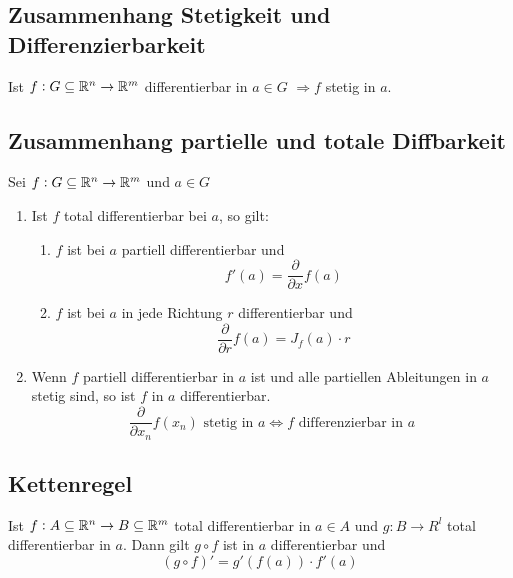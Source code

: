 \subsection{Zusammenhang Stetigkeit und Differenzierbarkeit}
Ist $f: G \subseteq \mathbb{R}^n \rightarrow \mathbb{R}^m$ differentierbar in $a \in G$
$\Rightarrow f$ stetig in $a$.

\subsection{Zusammenhang partielle und totale Diffbarkeit}
Sei $f: G \subseteq \mathbb{R}^n \rightarrow \mathbb{R}^m$ und $a \in G$
\begin{enumerate}[label= (\alph*)]
    \item Ist $f$ total differentierbar bei $a$, so gilt:
        \begin{enumerate}[label= (\alph*)]
            \item $f$ ist bei $a$ partiell differentierbar und
                \begin{equation*}
                    f'(a) = \frac{\partial}{\partial x} f(a)
                \end{equation*}
            \item $f$ ist bei $a$ in jede Richtung $r$ differentierbar und
                \begin{equation*}
                    \frac{\partial}{\partial r} f(a) = J_f(a) \cdot r
                \end{equation*}
        \end{enumerate}
    \item Wenn $f$ partiell differentierbar in $a$ ist und alle partiellen
        Ableitungen in $a$ stetig sind, so ist $f$ in $a$ differentierbar.
        \begin{equation*}
            \frac{\partial}{\partial x_n} f(x_n) \text{ stetig in }a
            \Leftrightarrow f \text{ differenzierbar in }a
        \end{equation*}
\end{enumerate}

\subsection{Kettenregel}
Ist $f: A \subseteq \mathbb{R}^n \rightarrow B \subseteq \mathbb{R}^m$ total differentierbar in
$a \in A$ und $g: B \rightarrow R^l$ total differentierbar in $a$. Dann gilt
$g \circ f$ ist in $a$ differentierbar und
\begin{equation*}
    {(g \circ f)}' = g'(f(a)) \cdot f'(a)
\end{equation*}

